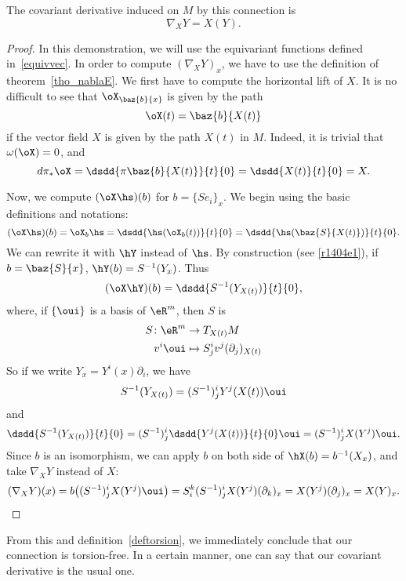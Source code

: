 \begin{proposition}
The covariant derivative induced on $M$ by this connection is
\begin{equation}\label{derrcovexplicite}
                 \nabla_XY=X(Y).
\end{equation}
\end{proposition}

\begin{proof}
In this demonstration, we will use the equivariant functions defined in~\ref{equivvec}. In order to compute $(\nabla_XY)_x$, we have to use the definition of theorem~\ref{tho_nablaE}. We first have to compute the horizontal lift of $X$. It is no difficult to see that $\oX_{\baz{b}{x}}$ is given by the path
\[\oX(t)=\baz{b}{X(t)}\]
if the vector field $X$ is given by the path $X(t)$ in $M$. Indeed, it is trivial that $\omega(\oX)=0$, and
\[d\pi_*\oX=\dsdd{\pi\baz{b}{X(t)}}{t}{0}=\dsdd{X(t)}{t}{0}=X.\]

Now, we compute $(\oX\hs)(b)$ for $b=\{Se_i\}_x$. We begin using the basic definitions and notations:
\[
(\oX\hs)(b)=\oX_b\hs=\dsdd{\hs(\oX_b(t))}{t}{0}=\dsdd{\hs(\baz{S}{X(t)})}{t}{0}.
\]
We can rewrite it with $\hY$ instead of $\hs$. By construction (see \eqref{r1404e1}), if $b=\baz{S}{x}$, $\hY(b)=S^{-1}(Y_x)$. Thus
\[
(\oX\hY)(b)=\dsdd{S^{-1}(Y_{X(t)})}{t}{0},
\]
where, if $\{\oui\}$ is a basis of $\eR^m$, then $S$ is
\begin{equation}
\begin{aligned}
 S\colon\eR^m&\to T_{X(t)}M \\
 v^i\oui &\mapsto S^i_jv^j(\partial_j)_{X(t)}
\end{aligned}
\end{equation}
So if we write $Y_x=Y^i(x)\partial_i$, we have
\[
S^{-1}(Y_{X(t)})=(S^{-1})^i_jY^j(X(t))\oui
\]
and
\[
\dsdd{S^{-1}(Y_{X(t)})}{t}{0}=(S^{-1})^i_j\dsdd{Y^j(X(t))}{t}{0}\oui=(S^{-1})^i_jX(Y^j)\oui.
\]
Since $b$ is an isomorphism, we can apply $b$ on both side of $\hX(b)=b^{-1}(X_x)$, and take $\nabla_XY$ instead of $X$:
\begin{equation}
 (\nabla_XY)(x)=b\big((S^{-1})^i_jX(Y^j)\oui\big)
               =S^k_i(S^{-1})^i_jX(Y^j)(\partial_k)_x
               =X(Y^j)(\partial_j)_x
               =X(Y)_x.
\end{equation}
\end{proof}

From this and definition~\ref{deftorsion}, we immediately conclude that our connection is torsion-free. In a certain manner, one can say that our covariant derivative is the usual one.

